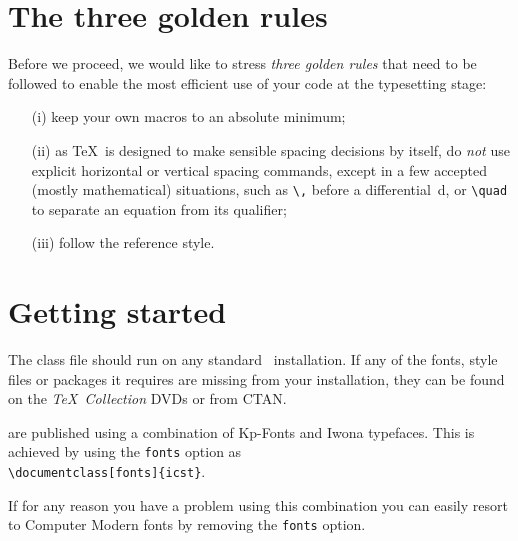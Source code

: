 \documentclass[fonts]{icst}
\begin{document}
\section{The three golden rules}
Before we proceed, we would like to stress \emph{three golden
rules} that need to be followed to enable the most efficient use
of your code at the typesetting stage:
\begin{enumerate}
\item[(i)] keep your own macros to an absolute minimum;

\item[(ii)] as \TeX\ is designed to make sensible spacing
decisions by itself, do \emph{not} use explicit horizontal or
vertical spacing commands, except in a few accepted (mostly
mathematical) situations, such as \verb"\," before a
differential~d, or \verb"\quad" to separate an equation from its
qualifier;

\item[(iii)] follow the \emph{\journalnamelc} reference style.
\end{enumerate}

\section{Getting started}
The \textsf{\journalclassshort} class file should run
on any standard \LaTeXe\ installation. If any of the fonts, style
files or packages it requires are missing from your installation,
they can be found on the \emph{\TeX\ Collection} DVDs or from
CTAN.

\emph{\journalnamelc} are published using a combination of Kp-Fonts
and Iwona typefaces. This is achieved by using the \verb"fonts"
option as\\
\verb"\documentclass[fonts]{icst}".

\noindent If for any reason you have a problem using this
combination you can easily resort to Computer Modern fonts by
removing the \verb"fonts" option.
\end{document}
